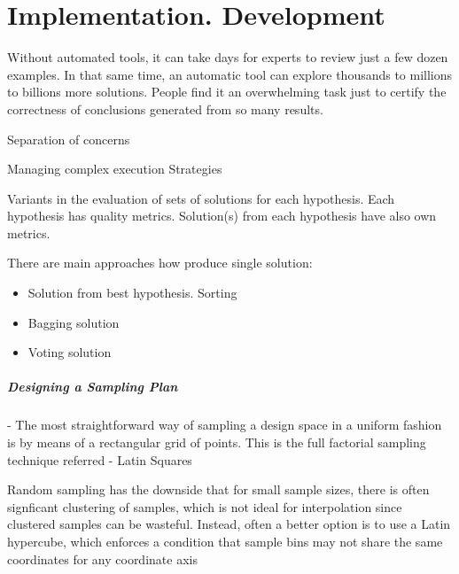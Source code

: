 \chapter{Implementation. Development}

Without automated tools, it can take days for experts to review just a few dozen examples.  In that same time, an automatic tool can explore thousands to millions to billions more solutions. People find it an overwhelming task just to certify the correctness of conclusions generated from so many results.

Separation of concerns

Managing complex execution Strategies

Variants in the evaluation of sets of solutions for each hypothesis. Each hypothesis has quality metrics. Solution(s) from each hypothesis have also own metrics.
               
There are main approaches how produce single solution: 
\begin{itemize}
    \item Solution from best hypothesis. Sorting
    \item Bagging solution
    \item Voting solution                
\end{itemize}

\paragraph{Designing a Sampling Plan}
 - The most straightforward way of sampling a design space in a uniform fashion is by \cite{EngSurMod}
 means of a rectangular grid of points. This is the full factorial sampling technique referred
 - Latin Squares

 Random sampling has the downside that for small sample sizes, there is often signficant clustering of samples, which is not ideal for interpolation since clustered samples can be wasteful. Instead, often a better option is to use a Latin hypercube, which enforces a condition that sample bins may not share the same coordinates for any coordinate axis

